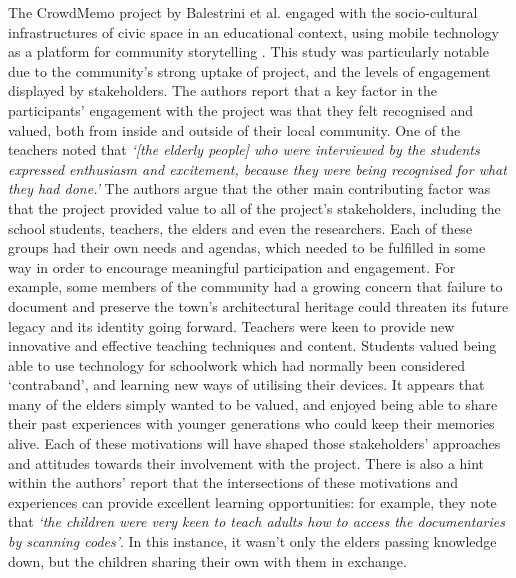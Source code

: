 The CrowdMemo project by Balestrini et al. engaged with the socio-cultural infrastructures of civic space in an educational context, using mobile technology as a platform for community storytelling \citep{Balestrini2014}. This study was particularly notable due to the community's strong uptake of project, and the levels of engagement displayed by stakeholders. The authors report that a key factor in the participants' engagement with the project was that they felt recognised and valued, both from inside and outside of their local community. One of the teachers noted that \textit{`[the elderly people] who were interviewed by the students expressed enthusiasm and excitement, because they were being recognised for what they had done.'} The authors argue that the other main contributing factor was that the project provided value to all of the project's stakeholders, including the school students, teachers, the elders and even the researchers. Each of these groups had their own needs and agendas, which needed to be fulfilled in some way in order to encourage meaningful participation and engagement. For example, some members of the community had a growing concern that failure to document and preserve the town's architectural heritage could threaten its future legacy and its identity going forward. Teachers were keen to provide new innovative and effective teaching techniques and content. Students valued being able to use technology for schoolwork which had normally been considered `contraband', and learning new ways of utilising their devices. It appears that many of the elders simply wanted to be valued, and enjoyed being able to share their past experiences with younger generations who could keep their memories alive. Each of these motivations will have shaped those stakeholders' approaches and attitudes towards their involvement with the project. There is also a hint within the authors' report that the intersections of these motivations and experiences can provide excellent learning opportunities: for example, they note that \textit{`the children were very keen to teach adults how to access the documentaries by scanning codes'}. In this instance, it wasn't only the elders passing knowledge down, but the children sharing their own with them in exchange.

